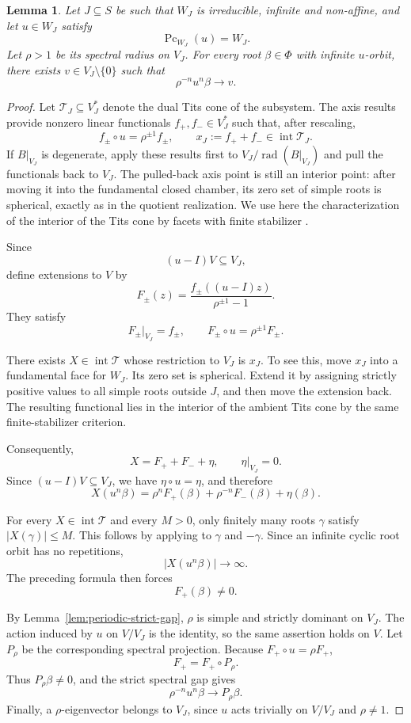 \documentclass[11pt,reqno]{amsart}
\theoremstyle{plain}
\newtheorem{lemma}[theorem]{Lemma}
\theoremstyle{definition}
\theoremstyle{remark}
\numberwithin{equation}{section}
\begin{document}
\begin{lemma}
\label{lem:periodic-ambient-root}
Let $J\subseteq S$ be such that $W_J$ is irreducible,
infinite and non-affine, and let $u\in W_J$ satisfy
\[
\operatorname{Pc}_{W_J}(u)=W_J.
\]
Let $\rho>1$ be its spectral radius on $V_J$.
For every root $\beta\in\Phi$ with infinite $u$-orbit,
there exists $v\in V_J\setminus\{0\}$ such that
\[
\rho^{-n}u^n\beta\longrightarrow v.
\]
\end{lemma}

\begin{proof}
Let $\mathcal T_J\subseteq V_J^*$ denote the dual Tits cone
of the subsystem.
The axis results
\cite[Theorems~6.5.10 and~6.5.14]{Krammer2009}
provide nonzero linear functionals $f_+,f_-\in V_J^*$ such that,
after rescaling,
\[
f_\pm\circ u=\rho^{\pm1}f_\pm,
\qquad
x_J:=f_++f_-\in\operatorname{int}\mathcal T_J.
\]
If $B|_{V_J}$ is degenerate, apply these results first to
$V_J/\operatorname{rad}(B|_{V_J})$ and pull the functionals
back to $V_J$.
The pulled-back axis point is still an interior point:
after moving it into the fundamental closed chamber, its
zero set of simple roots is spherical, exactly as in the
quotient realization.
We use here the characterization of the interior of the
Tits cone by facets with finite stabilizer
\cite[Corollary~2.2.5]{Krammer2009}.

Since
\[
(u-I)V\subseteq V_J,
\]
define extensions to $V$ by
\[
F_\pm(z)
=
\frac{f_\pm((u-I)z)}{\rho^{\pm1}-1}.
\]
They satisfy
\[
F_\pm|_{V_J}=f_\pm,
\qquad
F_\pm\circ u=\rho^{\pm1}F_\pm.
\]

There exists $X\in\operatorname{int}\mathcal T$ whose
restriction to $V_J$ is $x_J$.
To see this, move $x_J$ into a fundamental face for $W_J$.
Its zero set is spherical.
Extend it by assigning strictly positive values to all
simple roots outside $J$, and then move the extension back.
The resulting functional lies in the interior of the
ambient Tits cone by the same finite-stabilizer criterion.

Consequently,
\[
X=F_++F_-+\eta,
\qquad
\eta|_{V_J}=0.
\]
Since $(u-I)V\subseteq V_J$, we have $\eta\circ u=\eta$, and
therefore
\[
X(u^n\beta)
=
\rho^nF_+(\beta)
+\rho^{-n}F_-(\beta)
+\eta(\beta).
\]

For every $X\in\operatorname{int}\mathcal T$ and every
$M>0$, only finitely many roots $\gamma$ satisfy
$|X(\gamma)|\leq M$.
This follows by applying
\cite[Lemma~5.7.1]{Krammer2009}
to $\gamma$ and $-\gamma$.
Since an infinite cyclic root orbit has no repetitions,
\[
|X(u^n\beta)|\longrightarrow\infty.
\]
The preceding formula then forces
\[
F_+(\beta)\neq0.
\]

By Lemma~\ref{lem:periodic-strict-gap}, $\rho$ is simple
and strictly dominant on $V_J$.
The action induced by $u$ on $V/V_J$ is the identity,
so the same assertion holds on $V$.
Let $P_\rho$ be the corresponding spectral projection.
Because $F_+\circ u=\rho F_+$,
\[
F_+=F_+\circ P_\rho.
\]
Thus $P_\rho\beta\neq0$, and the strict spectral gap gives
\[
\rho^{-n}u^n\beta\longrightarrow P_\rho\beta.
\]
Finally, a $\rho$-eigenvector belongs to $V_J$, since $u$
acts trivially on $V/V_J$ and $\rho\neq1$.
\end{proof}
\end{document}
